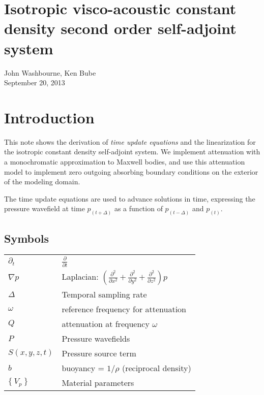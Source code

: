 \documentclass[10pt,fleqn]{article}
\begin{document}
\section{Isotropic visco-acoustic constant density second order self-adjoint system}
John Washbourne, Ken Bube\\
September 20, 2013


\section{Introduction}
This note shows the derivation of \textit{time update equations} and the linearization 
for the isotropic constant density self-adjoint system. We implement attenuation with a 
monochromatic approximation to Maxwell bodies, and use this attenuation model to 
implement zero outgoing absorbing boundary conditions on the exterior of the modeling 
domain.
\vspace{10pt}

The time update equations are used to advance solutions in time, expressing the pressure
wavefield at time $p_{(t + \Delta)}$ as a function of $p_{(t - \Delta)}$ and $p_{(t)}$.

\subsection{Symbols}
\begin{center}
	\begin{tabular}{ll}                                                                      \\[-10pt]
		$\partial_t$    & $\displaystyle \frac{\partial }{\partial t}$            \\[10pt]
		$\nabla p $     & Laplacian: $ \left(
			\displaystyle \frac{\partial^2 }{\partial x^2} +
			\displaystyle \frac{\partial^2 }{\partial y^2} +
			\displaystyle \frac{\partial^2 }{\partial z^2} \right) p $                \\[15pt]
		$\Delta$        & Temporal sampling rate                                  \\[10pt]
		$\omega$        & reference frequency for attenuation                     \\[10pt]
		$Q$             & attenuation at frequency $\omega$                       \\[10pt]
		$P$             & Pressure wavefields                                     \\[10pt]
		$S(x,y,z,t)$    & Pressure source term                                    \\[10pt]
		$b$             & buoyancy = $\displaystyle 1/\rho $ (reciprocal density) \\[10pt]
		$ \{\ V_p\ \} $ & Material parameters                                     \\[10pt]
	\end{tabular}
\end{center}
\end{document}
